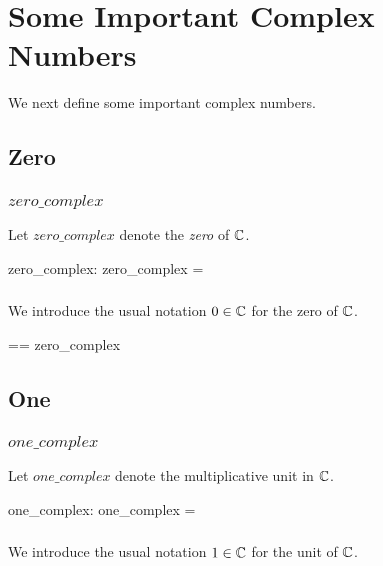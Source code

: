 \documentclass[11pt, oneside]{article}
\begin{document}
\section{Some Important Complex Numbers}

We next define some important complex numbers.

\subsection{Zero}

\subsubsection{$zero\_complex$}

Let $zero\_complex$ denote the \textit{zero} of $\mathbb{C}$.

\begin{axdef}
	zero\_complex: \C
\where
	zero\_complex = \asRC \zeroR
\end{axdef}

\subsubsection{}

We introduce the usual notation $0 \in \mathbb{C}$ for the zero of $\mathbb{C}$.

\begin{zed}
	\zeroC == zero\_complex
\end{zed}

\subsection{One}

\subsubsection{$one\_complex$}

Let $one\_complex$ denote the multiplicative unit in $\mathbb{C}$.

\begin{axdef}
	one\_complex: \C
\where
	one\_complex = \asRC \oneR
\end{axdef}

\subsubsection{}

We introduce the usual notation $1 \in \mathbb{C}$ for the unit of $\mathbb{C}$.
\end{document}
